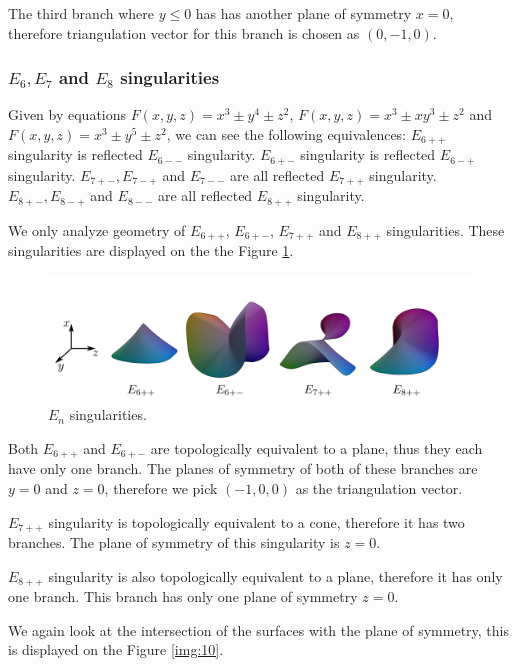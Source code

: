 The third branch where $y\leq0$ has has another plane of symmetry $x=0$,
therefore triangulation vector for this branch is chosen as $(0, -1, 0)$.

\subsubsection*{$E_6, E_7$ and $E_8$ singularities}

Given by equations $F(x,y,z)=x^3\pm y^4\pm z^2$, $F(x,y,z)=x^3\pm xy^3\pm z^2$
and $F(x,y,z)=x^3\pm y^5\pm z^2$, we can see the following equivalences:
$E_{6++}$ singularity is reflected $E_{6--}$ singularity.
$E_{6+-}$ singularity is reflected $E_{6-+}$ singularity.
$E_{7+-}, E_{7-+}$ and $E_{7--}$ are all reflected $E_{7++}$ singularity.
$E_{8+-}, E_{8-+}$ and $E_{8--}$ are all reflected $E_{8++}$ singularity.

We only analyze geometry of $E_{6++}$, $E_{6+-}$, $E_{7++}$ and $E_{8++}$
singularities. These singularities are displayed on the the Figure \ref{img:12}.


\begin{figure}
    \centerline{\includegraphics[scale=0.5]{images/img12}}
    \caption[$E_n$ singularities.]
    {$E_n$ singularities. \cite{singsurf}}
    \label{img:12}
\end{figure}
Both $E_{6++}$ and $E_{6+-}$ are topologically equivalent to a plane, thus
they each have only one branch. The planes of symmetry of both of these 
branches are $y=0$ and $z=0$, therefore we pick $(-1, 0, 0)$ as the
triangulation vector.

$E_{7++}$ singularity is topologically equivalent to a cone, therefore it has
two branches. The plane of symmetry of this singularity is $z=0$.

$E_{8++}$ singularity is also topologically equivalent to a plane, therefore
it has only one branch. This branch has only one plane of symmetry $z=0$.

We again look at the intersection of the surfaces with the plane of 
symmetry, this is displayed on the Figure \ref{img:10}.


